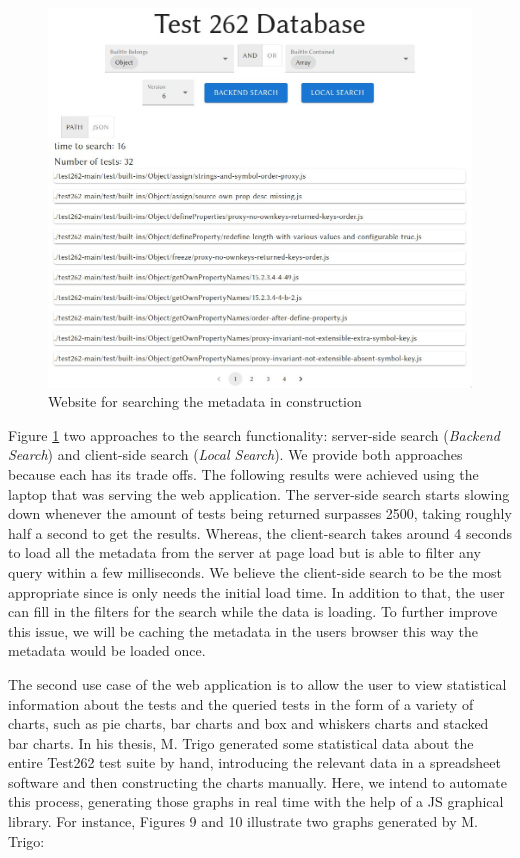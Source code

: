 \documentclass[runningheads]{llncs}
\begin{document}
\begin{figure}[ht]
    \centering
    \includegraphics[width=1\textwidth]{images/website.png}
    \caption{Website for searching the metadata in construction}
    \label{fig:website}
\end{figure}


Figure \ref{fig:website} two approaches to the search functionality: server-side search (\emph{Backend Search}) and client-side search (\emph{Local Search}). We provide both approaches because each has its trade offs. The following results were achieved using the laptop that was serving the web application. The server-side search starts slowing down whenever the amount of tests being returned surpasses 2500, taking roughly half a second to get the results. Whereas, the client-search takes around 4 seconds to load all the metadata from the server at page load but is able to filter any query within a few milliseconds. We believe the client-side search to be the most appropriate since is only needs the initial load time. In addition to that, the user can fill in the filters for the search while the data is loading. To further improve this issue, we will be caching the metadata in the users browser this way the metadata would be loaded once.

The second use case of the web application is to allow the user to view statistical information about the tests and the queried tests in the form of a variety of charts, such as pie charts, bar charts and box and whiskers charts and stacked bar charts. In his thesis, M. Trigo generated some statistical data about the entire Test262 test suite by hand, introducing the relevant data in a spreadsheet software and then constructing the charts manually. Here, we intend to automate this process, generating those graphs in real time with the help of a JS graphical library. For instance, Figures 9 and 10 illustrate two graphs generated by M. Trigo:
\end{document}
